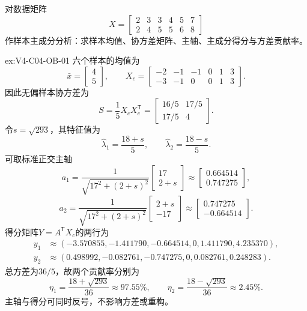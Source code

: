 \begin{SLChapterExercisePairSection}

\begin{exercise}\label{ex:V4-C04-OB-01}
对数据矩阵
\[
X=\begin{bmatrix}
2&3&3&4&5&7\\
2&4&5&5&6&8
\end{bmatrix}
\]
作样本主成分分析：求样本均值、协方差矩阵、主轴、主成分得分与方差贡献率。
\end{exercise}
\ifSLFullEdition
{}\label{sol:V4-C04-OB-01}
\begin{chapterexercisesolution}{ex:V4-C04-OB-01}
六个样本的均值为
\[
\bar x=\begin{bmatrix}4\\5\end{bmatrix},
\qquad
X_c=\begin{bmatrix}
-2&-1&-1&0&1&3\\
-3&-1&0&0&1&3
\end{bmatrix}.
\]
因此无偏样本协方差为
\[
S=\frac15X_cX_c^{\mathsf T}
=\begin{bmatrix}16/5&17/5\\17/5&4\end{bmatrix}.
\]
令$s=\sqrt{293}$，其特征值为
\[
\widehat\lambda_1=\frac{18+s}{5},\qquad
\widehat\lambda_2=\frac{18-s}{5}.
\]
可取标准正交主轴
\[
a_1=\frac1{\sqrt{17^2+(2+s)^2}}
\begin{bmatrix}17\\2+s\end{bmatrix}
\approx\begin{bmatrix}0.664514\\0.747275\end{bmatrix},
\]
\[
a_2=\frac1{\sqrt{17^2+(2+s)^2}}
\begin{bmatrix}2+s\\-17\end{bmatrix}
\approx\begin{bmatrix}0.747275\\-0.664514\end{bmatrix}.
\]
得分矩阵$Y=A^{\mathsf T}X_c$的两行为
\[
\begin{aligned}
y_1&\approx(-3.570855,-1.411790,-0.664514,0,1.411790,4.235370),\\
y_2&\approx(0.498992,-0.082761,-0.747275,0,0.082761,0.248283).
\end{aligned}
\]
总方差为$36/5$，故两个贡献率分别为
\[
\eta_1=\frac{18+\sqrt{293}}{36}\approx97.55\%,
\qquad
\eta_2=\frac{18-\sqrt{293}}{36}\approx2.45\%.
\]
主轴与得分可同时反号，不影响方差或重构。
\end{chapterexercisesolution}
\fi


\end{SLChapterExercisePairSection}
